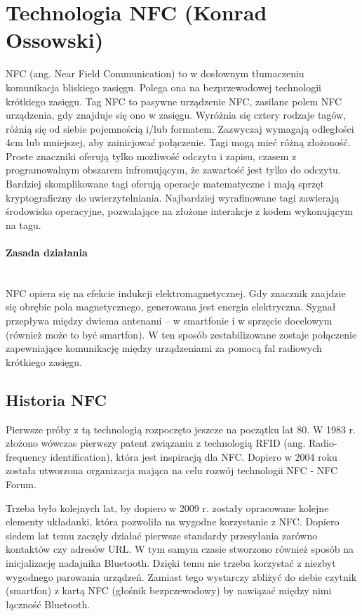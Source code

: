 \section{Technologia NFC (Konrad Ossowski)}
NFC (ang. Near Field Communication) to w dosłownym tłumaczeniu komunikacja bliskiego zasięgu. Polega ona na bezprzewodowej technologii krótkiego zasięgu. Tag NFC to pasywne urządzenie NFC, zasilane polem NFC urządzenia, gdy znajduje się ono w zasięgu. Wyróżnia się cztery rodzaje tagów, różnią się od siebie pojemnością i/lub formatem.  Zazwyczaj wymagają odległości 4cm lub mniejszej, aby zainicjować połączenie.  Tagi mogą mieć różną złożoność. Proste znaczniki oferują tylko możliwość odczytu i zapisu, czasem z programowalnym obszarem infromującym, że zawartość jest tylko do odczytu. Bardziej skomplikowane tagi oferują operacje matematyczne i mają sprzęt kryptograficzny do uwierzytelniania. Najbardziej wyrafinowane tagi zawierają środowisko operacyjne, pozwalające na złożone interakcje z kodem wykonującym na tagu.
\paragraph{Zasada działania}\mbox{}\\
NFC opiera się na efekcie indukcji elektromagnetycznej. Gdy znacznik znajdzie się obrębie pola magnetycznego, generowana jest energia elektryczna. Sygnał przepływa między dwiema antenami – w smartfonie i w sprzęcie docelowym (również może to być smartfon). W ten sposób zestabilizowane zostaje połączenie zapewniające komunikację między urządzeniami za pomocą fal radiowych krótkiego zasięgu.
\subsection{Historia NFC}
Pierwsze próby z tą technologią rozpoczęto jeszcze na początku lat 80. W 1983 r. złożono wówczas pierwszy patent związaniu z technologią RFID (ang. Radio-frequency identification), która jest inspiracją dla NFC. Dopiero w 2004 roku została utworzona organizacja mająca na celu rozwój technologii NFC - NFC Forum.
\par
Trzeba było kolejnych lat, by dopiero w 2009 r. zostały opracowane kolejne elementy układanki, która pozwoliła na wygodne korzystanie z NFC. Dopiero siedem lat temu zaczęły działać pierwsze standardy przesyłania zarówno kontaktów czy adresów URL. W tym samym czasie stworzono również sposób na inicjalizację nadajnika Bluetooth. Dzięki temu nie trzeba korzystać z niezbyt wygodnego parowania urządzeń. Zamiast tego wystarczy zbliżyć do siebie czytnik (smartfon) z kartą NFC (głośnik bezprzewodowy) by nawiązać między nimi łączność Bluetooth.

